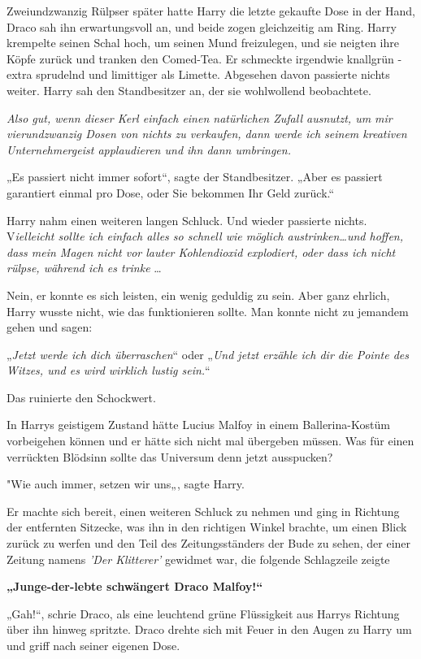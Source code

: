 {Zweiundzwanzig Rülpser später hatte Harry die letzte gekaufte Dose in der Hand, Draco sah ihn erwartungsvoll an, und beide zogen gleichzeitig am Ring. Harry krempelte seinen Schal hoch, um seinen Mund freizulegen, und sie neigten ihre Köpfe zurück und tranken den Comed-Tea. Er schmeckte irgendwie knallgrün - extra sprudelnd und limittiger als Limette. Abgesehen davon passierte nichts weiter. Harry sah den Standbesitzer an, der sie wohlwollend beobachtete.

\emph{Also gut, wenn dieser Kerl einfach einen natürlichen Zufall ausnutzt, um mir vierundzwanzig Dosen von nichts zu verkaufen, dann werde ich seinem kreativen Unternehmergeist applaudieren und ihn dann umbringen.}

„Es passiert nicht immer sofort“, sagte der Standbesitzer. „Aber es passiert garantiert einmal pro Dose, oder Sie bekommen Ihr Geld zurück.“

Harry nahm einen weiteren langen Schluck. Und wieder passierte nichts. V\emph{ielleicht sollte ich einfach alles so schnell wie möglich austrinken…und hoffen, dass mein Magen nicht vor lauter Kohlendioxid explodiert, oder dass ich nicht rülpse, während ich es trinke} …

Nein, er konnte es sich leisten, ein wenig geduldig zu sein. Aber ganz ehrlich, Harry wusste nicht, wie das funktionieren sollte. Man konnte nicht zu jemandem gehen und sagen:

„\emph{Jetzt werde ich dich überraschen}“ oder „\emph{Und jetzt erzähle ich dir die Pointe des Witzes, und es wird wirklich lustig sein.}“

Das ruinierte den Schockwert.

In Harrys geistigem Zustand hätte Lucius Malfoy in einem Ballerina-Kostüm vorbeigehen können und er hätte sich nicht mal übergeben müssen. Was für einen verrückten Blödsinn sollte das Universum denn jetzt ausspucken?

"Wie auch immer, setzen wir uns„, sagte Harry.

Er machte sich bereit, einen weiteren Schluck zu nehmen und ging in Richtung der entfernten Sitzecke, was ihn in den richtigen Winkel brachte, um einen Blick zurück zu werfen und den Teil des Zeitungsständers der Bude zu sehen, der einer Zeitung namens \emph{'Der Klitterer'} gewidmet war, die folgende Schlagzeile zeigte

\textbf{„Junge-der-lebte schwängert Draco Malfoy!“}

„Gah!“, schrie Draco, als eine leuchtend grüne Flüssigkeit aus Harrys Richtung über ihn hinweg spritzte. Draco drehte sich mit Feuer in den Augen zu Harry um und griff nach seiner eigenen Dose.

}
